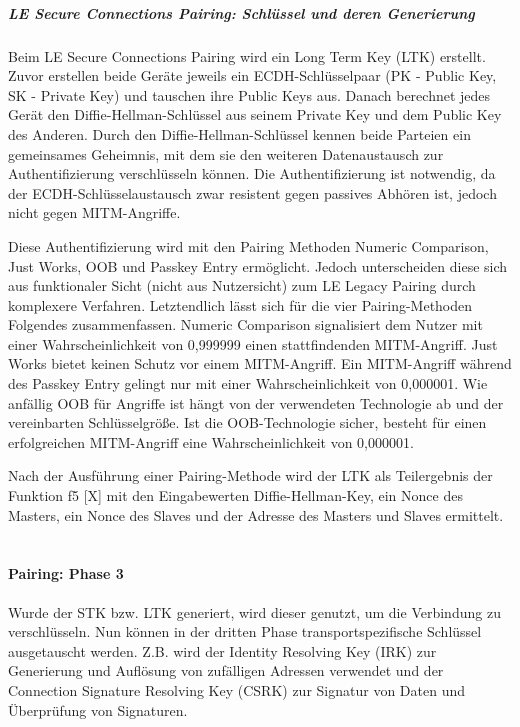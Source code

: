 \subparagraph{LE Secure Connections Pairing: Schlüssel und deren Generierung}

Beim LE Secure Connections Pairing wird ein Long Term Key (LTK) erstellt. Zuvor erstellen beide Geräte jeweils ein ECDH-Schlüsselpaar (PK - Public Key, SK - Private Key) und tauschen ihre Public Keys aus. Danach berechnet jedes Gerät den Diffie-Hellman-Schlüssel aus seinem Private Key und dem Public Key des Anderen. Durch den Diffie-Hellman-Schlüssel kennen beide Parteien ein gemeinsames Geheimnis, mit dem sie den weiteren Datenaustausch zur Authentifizierung verschlüsseln können. Die Authentifizierung ist notwendig, da der ECDH-Schlüsselaustausch zwar resistent gegen passives Abhören ist, jedoch nicht gegen MITM-Angriffe.

Diese Authentifizierung wird mit den Pairing Methoden Numeric Comparison, Just Works, OOB und Passkey Entry ermöglicht. Jedoch unterscheiden diese sich aus funktionaler Sicht (nicht aus Nutzersicht) zum LE Legacy Pairing durch komplexere Verfahren. Letztendlich lässt sich für die vier Pairing-Methoden Folgendes zusammenfassen. Numeric Comparison signalisiert dem Nutzer mit einer Wahrscheinlichkeit von 0,999999 einen stattfindenden MITM-Angriff. 
Just Works bietet keinen Schutz vor einem MITM-Angriff. 
Ein MITM-Angriff während des Passkey Entry gelingt nur mit einer Wahrscheinlichkeit von 0,000001. 
Wie anfällig OOB für Angriffe ist hängt von der verwendeten Technologie ab und der vereinbarten Schlüsselgröße. Ist die OOB-Technologie sicher, besteht für einen erfolgreichen MITM-Angriff eine Wahrscheinlichkeit von 0,000001.

Nach der Ausführung einer Pairing-Methode wird der LTK als Teilergebnis der Funktion f5 [X] 
mit den Eingabewerten Diffie-Hellman-Key, ein Nonce des Masters, ein Nonce des Slaves und der Adresse des Masters und Slaves ermittelt.\\\\

\paragraph{Pairing: Phase 3}
Wurde der STK bzw. LTK generiert, wird dieser genutzt, um die Verbindung zu verschlüsseln. Nun können in der dritten Phase transportspezifische Schlüssel ausgetauscht werden. Z.B. wird der Identity Resolving Key (IRK) zur Generierung und Auflösung von zufälligen Adressen verwendet und der Connection Signature Resolving Key (CSRK) zur Signatur von Daten und Überprüfung von Signaturen.

